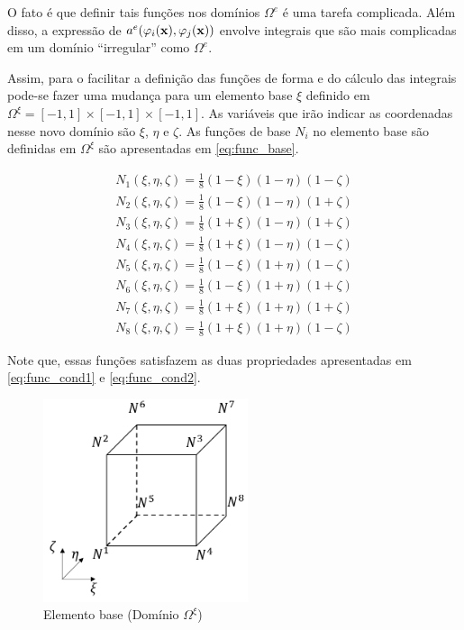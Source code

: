 O fato é que definir tais funções nos domínios $\Omega^e$ é uma tarefa complicada. Além disso, a expressão de $a^e(\varphi_i(\mathbf{x}),\varphi_j(\mathbf{x}))$ envolve integrais que são mais complicadas em um domínio {\color{red}``irregular''} como $\Omega^e$.


Assim, para o facilitar a definição das funções de forma e do cálculo das integrais pode-se fazer uma mudança para um elemento base $\xi$ definido em $\Omega^\xi = [-1,1]\times[-1,1]\times[-1,1]$. As variáveis que irão indicar as coordenadas nesse novo domínio são $\xi$, $\eta$ e $\zeta$. As funções de base $N_i$ no elemento base são definidas em $\Omega^\xi$ são apresentadas em \ref{eq:func_base}.

\begin{equation}
\begin{matrix}\label{eq:func_base}
N_1(\xi, \eta, \zeta) = \frac{1}{8} (1-\xi)(1-\eta)(1-\zeta) \\
N_2(\xi, \eta, \zeta) = \frac{1}{8} (1-\xi)(1-\eta)(1+\zeta) \\
N_3(\xi, \eta, \zeta) = \frac{1}{8} (1+\xi)(1-\eta)(1+\zeta) \\
N_4(\xi, \eta, \zeta) = \frac{1}{8} (1+\xi)(1-\eta)(1-\zeta) \\
N_5(\xi, \eta, \zeta) = \frac{1}{8} (1-\xi)(1+\eta)(1-\zeta) \\
N_6(\xi, \eta, \zeta) = \frac{1}{8} (1-\xi)(1+\eta)(1+\zeta) \\
N_7(\xi, \eta, \zeta) = \frac{1}{8} (1+\xi)(1+\eta)(1+\zeta) \\
N_8(\xi, \eta, \zeta) = \frac{1}{8} (1+\xi)(1+\eta)(1-\zeta)
\end{matrix}
\end{equation}

Note que, essas funções satisfazem as duas propriedades apresentadas em \ref{eq:func_cond1} e \ref{eq:func_cond2}.


\begin{figure}[!htbp]
\label{fig:elemento_base}
\centering
\includegraphics[width=6cm]{chap01/elemento_base.png} 
\caption{Elemento base (Domínio $\Omega^\xi$)}
\end{figure}



